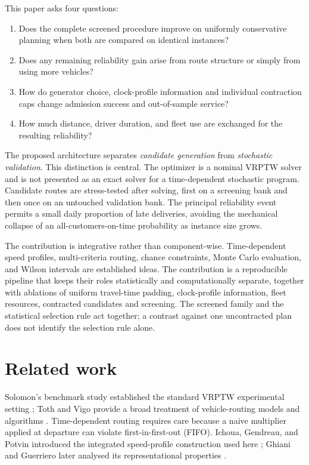 \documentclass[11pt,a4paper]{article}
\begin{document}
This paper asks four questions:
\begin{enumerate}
  \item Does the complete screened procedure improve on uniformly
        conservative planning when both are compared on identical instances?
  \item Does any remaining reliability gain arise from route structure or
        simply from using more vehicles?
  \item How do generator choice, clock-profile information and individual
        contraction caps change admission success and out-of-sample service?
  \item How much distance, driver duration, and fleet use are exchanged for the
        resulting reliability?
\end{enumerate}

The proposed architecture separates \emph{candidate generation} from
\emph{stochastic validation}. This distinction is central. The optimizer is a
nominal VRPTW solver and is not presented as an exact solver for a
time-dependent stochastic program. Candidate routes are stress-tested after
solving, first on a screening bank and then once on an untouched validation
bank. The principal reliability event permits a small daily proportion of late
deliveries, avoiding the mechanical collapse of an all-customers-on-time
probability as instance size grows.

The contribution is integrative rather than component-wise. Time-dependent
speed profiles, multi-criteria routing, chance constraints, Monte Carlo
evaluation, and Wilson intervals are established ideas. The contribution is a
reproducible pipeline that keeps their roles statistically and computationally
separate, together with ablations of uniform travel-time padding, clock-profile
information, fleet resources, contracted candidates and screening. The
screened family and the statistical selection rule act together; a contrast
against one uncontracted plan does not identify the selection rule alone.

\section{Related work}

Solomon's benchmark study established the standard VRPTW experimental setting
\cite{solomon1987}; Toth and Vigo provide a broad treatment of vehicle-routing
models and algorithms \cite{toth2014}. Time-dependent routing requires care
because a naive multiplier applied at departure can violate first-in-first-out
(FIFO). Ichoua, Gendreau, and Potvin introduced the integrated speed-profile
construction used here \cite{ichoua2003}; Ghiani and Guerriero later analysed
its representational properties \cite{ghiani2014}.
\end{document}
